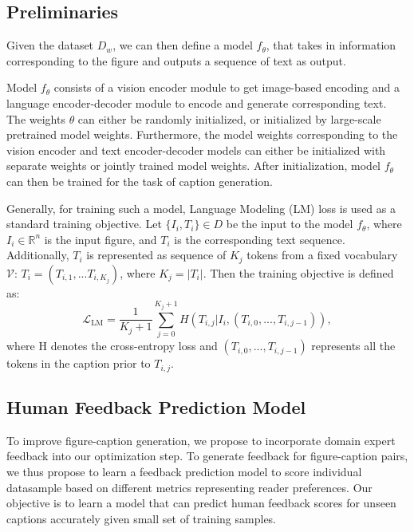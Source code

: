 \documentclass[11pt]{article}
\begin{document}
\subsection{Preliminaries}\label{prelim}

Given the dataset $D_w$, we can then define a model $f_\theta$, that takes in information corresponding to the figure and outputs a sequence of text as output.

Model $f_\theta$ consists of a vision encoder module to get image-based encoding and a language encoder-decoder module to encode and generate corresponding text. The weights $\theta$ can either be randomly initialized, or initialized by large-scale pretrained model weights. Furthermore, the model weights corresponding to the vision encoder and text encoder-decoder models can either be initialized with separate weights or jointly trained model weights. After initialization, model $f_\theta$ can then be trained for the task of caption generation.

Generally, for training such a model, Language Modeling (LM) loss is used as a standard training objective. 
Let $\{ I_i, T_i \} \in D$ be the input to the model $f_\theta$, where $ I_i \in \mathbb{R}^n$ is the input figure, and $T_i$ is the corresponding text sequence. Additionally, $T_i$ is represented as sequence of $K_j$ tokens from a fixed vocabulary $\mathcal{V}$: $T_i = (T_{i,1},...T_{i,K_j})$, where $K_j = |T_i|$. 
Then the training objective is defined as:
\begin{equation}\label{obj:lm}
    \mathcal{L}_\text{LM} = \frac{1}{K_j +1}\sum\limits_{j=0}^{K_j + 1} H(T_{i,j} | I_i, (T_{i,0}, ...,T_{i,j-1})) ,
\end{equation}
where H denotes the cross-entropy loss and $(T_{i,0}, ...,T_{i,j-1})$ represents all the tokens in the caption prior to $T_{i,j}$.

\subsection{Human Feedback Prediction Model} \label{human-feedback-model}
To improve figure-caption generation, we propose to incorporate domain expert feedback into our optimization step. To generate feedback for figure-caption pairs, we thus propose to learn a feedback prediction model to score individual datasample based on different metrics representing reader preferences. Our objective is to learn a model that can predict human feedback scores for unseen captions accurately given small set of training samples.
\end{document}
